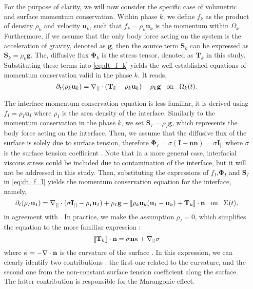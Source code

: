 For the purpose of clarity, we will now consider the specific case of volumetric and surface momentum conservation.
Within phase $k$, we define $f_k$ as the product of density $\rho_k$ and velocity $\textbf{u}_k$, such that $f_k = \rho_k \textbf{u}_k$ is the momentum within $\Omega_k$.
Furthermore, if we assume that the only body force acting on the system is the acceleration of gravity, denoted as $\textbf{g}$, then the source term $\textbf{S}_k$ can be expressed as $\textbf{S}_k = \rho_k \textbf{g}$.
The, diffusive flux $\mathbf{\Phi}_k$ is the stress tensor, denoted as $\textbf{T}_k$ in this study. 
Substituting these terms into \ref{eq:dt_f_k} yields the well-established equations of momentum conservation valid in the phase $k$. 
It reads, 
\begin{equation*}
    \partial_t (\rho_k\textbf{u}_k)  
    = 
    \mathbf{\nabla}_{||} \cdot (\textbf{T}_k - \rho_k\textbf{u}_k)
    + \rho_k \textbf{g}
     \;\;\; \text{on} \;\;\;\Omega_k(t).
\end{equation*} 

The interface momentum conservation equation is less familiar, it is derived using $f_I = \rho_I \textbf{u}_I$ \citep{morel2015mathematical} where $\rho_I$ is the area density of the interface. 
Similarly to the momentum conservation in the phase $k$, we set $\textbf{S}_I = \rho_I \textbf{g}$, which represents the body force acting on the interface. 
Then, we assume that the diffusive flux of the surface is solely due to surface tension, therefore $\mathbf{\Phi}_I  = \sigma (\textbf{I} - \textbf{nn}) = \sigma \textbf{I}_{||}$ where $\sigma$ is the surface tension coefficient \citep[Chapter 2]{tryggvason2011direct}.  
Note that in a more general case, interfacial viscous stress could be included \citep{brenner2013interfacial,slattery2007interfacial} due to contamination of the interface, but it will not be addressed in this study. 
Then, substituting the expressions of $f_I$,$\mathbf{\Phi}_I$ and $\textbf{S}_I$ in \ref{eq:dt_f_I} yields the momentum conservation equation for the interface, namely,
\begin{equation*}
    \partial_t (\rho_I\textbf{u}_I)  
    = 
    \mathbf{\nabla}_{||} \cdot (\sigma \textbf{I}_{||} - \rho_I\textbf{u}_I)
    + \rho_I \textbf{g}
    - \llbracket 
        \rho_k \textbf{u}_k (\textbf{u}_I - \textbf{u}_k)
        + \mathbf{T}_k
     \rrbracket \cdot \textbf{n} \;\;\; \text{on} \;\;\;\Sigma(t),
\end{equation*} 
in agreement with \citet{manikantan2020surfactant}. 
In practice, we make the assumption $\rho_I = 0$, which simplifies the equation to the more familiar expression :
\begin{equation}
    \llbracket \textbf{T}_k \rrbracket \cdot \textbf{n} 
    =
    \sigma\textbf{n}\kappa
    + \mathbf{\nabla}_{||}\sigma 
    \label{eq:surface_tension}
\end{equation}
where $\kappa = - \mathbf{\nabla}\cdot\textbf{n}$ is the curvature of the surface \citet[Chapter 2]{tryggvason2011direct}. 
In this expression, we can clearly identify two contributions : the first one related to the curvature, and the second one from the non-constant surface tension coefficient along the surface. 
The latter contribution is responsible for the Marangonie effect. 

